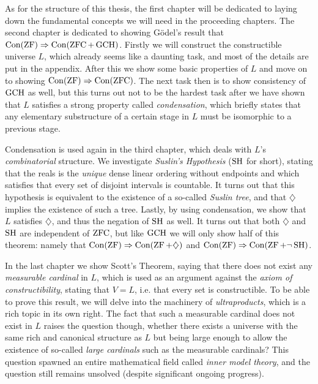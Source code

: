 \begin{onehalfspacing}
As for the structure of this thesis, the first chapter will be dedicated to laying down the fundamental concepts we will need in the proceeding chapters. The second chapter is dedicated to showing Gödel's result that $\operatorname{Con}(\operatorname{ZF})\Rightarrow\operatorname{Con}(\operatorname{ZFC}+\operatorname{GCH})$. Firstly we will construct the constructible universe $L$, which already seems like a daunting task, and most of the details are put in the appendix. After this we show some basic properties of $L$ and move on to showing $\operatorname{Con}(\operatorname{ZF})\Rightarrow\operatorname{Con}(\operatorname{ZFC})$. The next task then is to show consistency of $\operatorname{GCH}$ as well, but this turns out not to be the hardest task after we have shown that $L$ satisfies a strong property called \textit{condensation}, which briefly states that any elementary substructure of a certain stage in $L$ must be isomorphic to a previous stage.

Condensation is used again in the third chapter, which deals with $L$'s \textit{combinatorial} structure. We investigate \textit{Suslin's Hypothesis} ($\operatorname{SH}$ for short), stating that the reals is the \textit{unique} dense linear ordering without endpoints and which satisfies that every set of disjoint intervals is countable. It turns out that this hypothesis is equivalent to the existence of a so-called \textit{Suslin tree}, and that $\diamondsuit$ implies the existence of such a tree. Lastly, by using condensation, we show that $L$ satisfies $\diamondsuit$, and thus the negation of $\operatorname{SH}$ as well. It turns out that both $\diamondsuit$ and $\operatorname{SH}$ are independent of $\operatorname{ZFC}$, but like $\operatorname{GCH}$ we will only show half of this theorem: namely that $\operatorname{Con}(\operatorname{ZF})\Rightarrow\operatorname{Con}(\operatorname{ZF}+\diamondsuit)$ and $\operatorname{Con}(\operatorname{ZF})\Rightarrow\operatorname{Con}(\operatorname{ZF}+\lnot\operatorname{SH})$.

In the last chapter we show Scott's Theorem, saying that there does not exist any \textit{measurable cardinal} in $L$, which is used as an argument against the \textit{axiom of constructibility}, stating that $V=L$, i.e. that every set is constructible. To be able to prove this result, we will delve into the machinery of \textit{ultraproducts}, which is a rich topic in its own right. The fact that such a measurable cardinal does not exist in $L$ raises the question though, whether there exists a universe with the same rich and canonical structure as $L$ but being large enough to allow the existence of so-called \textit{large cardinals} such as the measurable cardinals? This question spawned an entire mathematical field called \textit{inner model theory}, and the question still remains unsolved (despite significant ongoing progress).

\end{onehalfspacing}

\setlength{\parindent}{0pt}